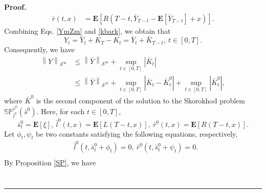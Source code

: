\documentclass[10pt]{article}%
\numberwithin{equation}{section}
\newenvironment{proof}[1][Proof]{\noindent \textbf{#1.} }{\  \rule{0.5em}{0.5em}}
\def \E{\mathbf{E}}
\begin{document}
\begin{proof}
\begin{equation}
\begin{split}
\bar{r}(t,x)&=\E\left[R({T-t},\bar{Y}_{T-t}-\E\left[\bar{Y}_{T-t}\right]+x)\right].
\end{split}\end{equation}
Combining Eqs. \eqref{YmZm} and \eqref{kbark}, we obtain that  
$$
Y_t=\bar{Y}_t+K_T-K_t=\bar{Y}_t+\bar{K}_{T-t},  \ t\in[0,T].
$$
Consequently, we have
\begin{equation}\label{re-1}
\begin{split}
 \left \| Y \right \|_{\mathcal{S}^{\infty}}&\leq \left \| \bar{Y} \right \|_{\mathcal{S}^{\infty}}+\sup_{t\in[0,T]}\left|\bar{K}_t\right|\\
 &\leq \left \| \bar{Y} \right \|_{\mathcal{S}^{\infty}}+\sup_{t\in[0,T]}\left|\bar{K}_t-\bar{K}^0_t\right|+\sup_{t\in[0,T]}\left|\bar{K}^0_t\right|,   
\end{split}   
\end{equation}
where $\bar{K}^0$ is the second component of the solution to the Skorokhod problem $\mathbb{SP}^{\bar{r}^0}_{\bar{l}^0}(\bar{s}^0)$. Here, for each $t\in[0,T]$, 
\begin{equation}\label{slr}
\bar{s}^0_t=\E[\xi],\ \bar{l}^0(t,x)=\E\left[L(T-t,x)\right], \ \bar{r}^0(t,x)=\E\left[R(T-t,x)\right].
\end{equation}
Let $\phi_t,\psi_t$ be two constants satisfying the following equations, respectively,
\begin{equation*}\begin{split}
&\bar{l}^0(t,\bar{s}_t^0+ \phi_t)=0, \ \bar{r}^0(t,\bar{s}_t^0+ \psi_t)=0.\\
\end{split}\end{equation*} 
By Proposition \ref{SP}, we have 
\begin{equation}\label{barK0}\begin{split}

\end{split}
\end{equation}
\end{proof}
\end{document}
